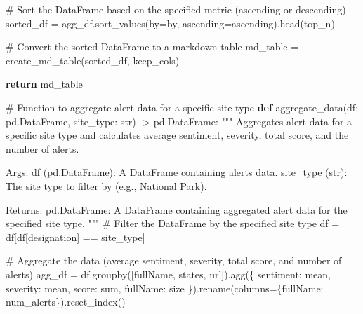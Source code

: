 \documentclass[
  letterpaper,
  DIV=11,
  numbers=noendperiod]{scrartcl}
\newenvironment{Shaded}{\begin{snugshade}}{\end{snugshade}}
\newcommand{\BuiltInTok}[1]{\textcolor[rgb]{0.00,0.23,0.31}{#1}}
\newcommand{\CommentTok}[1]{\textcolor[rgb]{0.37,0.37,0.37}{#1}}
\newcommand{\ControlFlowTok}[1]{\textcolor[rgb]{0.00,0.23,0.31}{\textbf{#1}}}
\newcommand{\KeywordTok}[1]{\textcolor[rgb]{0.00,0.23,0.31}{\textbf{#1}}}
\newcommand{\NormalTok}[1]{\textcolor[rgb]{0.00,0.23,0.31}{#1}}
\newcommand{\OperatorTok}[1]{\textcolor[rgb]{0.37,0.37,0.37}{#1}}
\newcommand{\StringTok}[1]{\textcolor[rgb]{0.13,0.47,0.30}{#1}}
\begin{document}
\begin{Shaded}
\begin{Highlighting}[]
    \CommentTok{\# Sort the DataFrame based on the specified metric (ascending or descending)}
\NormalTok{    sorted\_df }\OperatorTok{=}\NormalTok{ agg\_df.sort\_values(by}\OperatorTok{=}\NormalTok{by, ascending}\OperatorTok{=}\NormalTok{ascending).head(top\_n)}

    \CommentTok{\# Convert the sorted DataFrame to a markdown table}
\NormalTok{    md\_table }\OperatorTok{=}\NormalTok{ create\_md\_table(sorted\_df, keep\_cols)}

    \ControlFlowTok{return}\NormalTok{ md\_table}

\CommentTok{\# Function to aggregate alert data for a specific site type}
\KeywordTok{def}\NormalTok{ aggregate\_data(df: pd.DataFrame, site\_type: }\BuiltInTok{str}\NormalTok{) }\OperatorTok{{-}\textgreater{}}\NormalTok{ pd.DataFrame:}
    \CommentTok{"""}
\CommentTok{    Aggregates alert data for a specific site type and calculates average sentiment, severity,}
\CommentTok{    total score, and the number of alerts.}

\CommentTok{    Args:}
\CommentTok{        df (pd.DataFrame): A DataFrame containing alerts data.}
\CommentTok{        site\_type (str): The site type to filter by (e.g., \textquotesingle{}National Park\textquotesingle{}).}

\CommentTok{    Returns:}
\CommentTok{        pd.DataFrame: A DataFrame containing aggregated alert data for the specified site type.}
\CommentTok{    """}
    \CommentTok{\# Filter the DataFrame by the specified site type}
\NormalTok{    df }\OperatorTok{=}\NormalTok{ df[df[}\StringTok{\textquotesingle{}designation\textquotesingle{}}\NormalTok{] }\OperatorTok{==}\NormalTok{ site\_type]}

    \CommentTok{\# Aggregate the data (average sentiment, severity, total score, and number of alerts)}
\NormalTok{    agg\_df }\OperatorTok{=}\NormalTok{ df.groupby([}\StringTok{\textquotesingle{}fullName\textquotesingle{}}\NormalTok{, }\StringTok{\textquotesingle{}states\textquotesingle{}}\NormalTok{, }\StringTok{\textquotesingle{}url\textquotesingle{}}\NormalTok{]).agg(\{}
        \StringTok{\textquotesingle{}sentiment\textquotesingle{}}\NormalTok{: }\StringTok{\textquotesingle{}mean\textquotesingle{}}\NormalTok{,}
        \StringTok{\textquotesingle{}severity\textquotesingle{}}\NormalTok{: }\StringTok{\textquotesingle{}mean\textquotesingle{}}\NormalTok{,}
        \StringTok{\textquotesingle{}score\textquotesingle{}}\NormalTok{: }\StringTok{\textquotesingle{}sum\textquotesingle{}}\NormalTok{,}
        \StringTok{\textquotesingle{}fullName\textquotesingle{}}\NormalTok{: }\StringTok{\textquotesingle{}size\textquotesingle{}}
\NormalTok{    \}).rename(columns}\OperatorTok{=}\NormalTok{\{}\StringTok{\textquotesingle{}fullName\textquotesingle{}}\NormalTok{: }\StringTok{\textquotesingle{}num\_alerts\textquotesingle{}}\NormalTok{\}).reset\_index()}


\end{Highlighting}
\end{Shaded}
\end{document}
